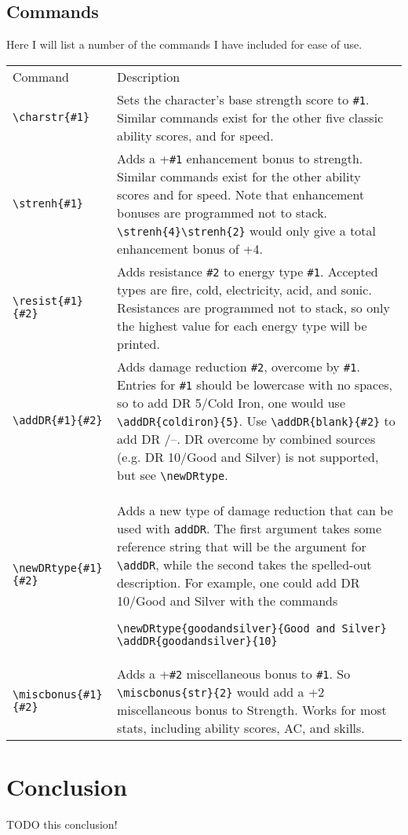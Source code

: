 \documentclass[oneside]{article}
\begin{document}
\subsection{Commands}
Here I will list a number of the commands I have included for ease of use.
\begin{tabular}{lp{8cm}}
Command & Description\\
\verb|\charstr{#1}| & Sets the character's base strength score to \verb|#1|. Similar commands exist for the other five classic ability scores, and for speed.\\
\verb|\strenh{#1}| & Adds a +\verb|#1| enhancement bonus to strength.  Similar commands exist for the other ability scores and for speed.  Note that enhancement bonuses are programmed not to stack.  \verb|\strenh{4}\strenh{2}| would only give a total enhancement bonus of +4.\\
\verb|\resist{#1}{#2}| & Adds resistance \verb|#2| to energy type \verb|#1|.  Accepted types are fire, cold, electricity, acid, and sonic.  Resistances are programmed not to stack, so only the highest value for each energy type will be printed.\\
\verb|\addDR{#1}{#2}| & Adds damage reduction \verb|#2|, overcome by \verb|#1|. Entries for \verb|#1| should be lowercase with no spaces, so to add DR 5/Cold Iron, one would use \verb|\addDR{coldiron}{5}|.  Use \verb|\addDR{blank}{#2}| to add DR /--. DR overcome by combined sources (e.g. DR 10/Good and Silver) is not supported, but see \verb|\newDRtype|.\\
\verb|\newDRtype{#1}{#2}| & Adds a new type of damage reduction that can be used with \verb|addDR|. The first argument takes some reference string that will be the argument for \verb|\addDR|, while the second takes the spelled-out description.  For example, one could add DR 10/Good and Silver with the commands
\begin{verbatim}
\newDRtype{goodandsilver}{Good and Silver}
\addDR{goodandsilver}{10}
\end{verbatim}\\
\verb|\miscbonus{#1}{#2}| & Adds a +\verb|#2| miscellaneous bonus to \verb|#1|.  So \verb|\miscbonus{str}{2}| would add a +2 miscellaneous bonus to Strength. Works for most stats, including ability scores, AC, and skills.
\end{tabular}
\section{Conclusion}
\label{sec:conclusion}

TODO this conclusion!
\end{document}
